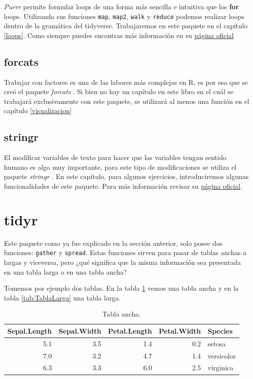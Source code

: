 \documentclass[]{book}
\begin{document}
\emph{Purrr} \citep{HenryPurrr} permite formular loops de una forma más
sencilla e intuitiva que los \textbf{for} loops. Utilizando sus
funciones \texttt{map}, \texttt{map2}, \texttt{walk} y \texttt{reduce}
podemos realizar loops dentro de la gramática del tidyverse.
Trabajaremos en este paquete en el capítulo \ref{loops}. Como siempre
puedes encontras más información en su
\href{https://purrr.tidyverse.org/}{página oficial}

\hypertarget{forcats}{%
\subsection{forcats}\label{forcats}}

Trabajar con factores es una de las labores más complejas en R, es por
eso que se creó el paquete \emph{forcats} \citep{Wickhamforcats}. Si
bien no hay un capítulo en este libro en el cuál se trabajará
exclusivamente con este paquete, se utilizará al menos una función en el
capítulo \ref{visualizacion}

\hypertarget{stringr}{%
\subsection{stringr}\label{stringr}}

El modíficar variables de texto para hacer que las variables tengan
sentido humano es algo muy importante, para este tipo de modificaciones
se utiliza el paquete \emph{stringr} \citep{Wickhamstringr}. En este
capítulo, para algunos ejercicios, introduciremos algunas
funcionalidades de este paquete. Para más información revisar su
\href{https://stringr.tidyverse.org/}{página oficial}.

\hypertarget{tidyr-1}{%
\section{tidyr}\label{tidyr-1}}

Este paquete como ya fue explicado en la sección anterior, solo posee
dos funciones: \texttt{gather} y \texttt{spread}. Estas funciones sirven
para pasar de tablas anchas a largas y viceversa, pero ¿qué significa
que la misma información sea presentada en una tabla larga o en una
tabla ancha?

Tomemos por ejemplo dos tablas. En la tabla \ref{tab:TablaAncha} vemos
una tabla ancha y en la tabla \ref{tab:TablaLarga} una tabla larga.

\begin{table}

\caption{\label{tab:TablaAncha}Tabla ancha.}
\centering
\begin{tabular}[t]{rrrrl}
\toprule
Sepal.Length & Sepal.Width & Petal.Length & Petal.Width & Species\\
\midrule
5.1 & 3.5 & 1.4 & 0.2 & setosa\\
7.0 & 3.2 & 4.7 & 1.4 & versicolor\\
6.3 & 3.3 & 6.0 & 2.5 & virginica\\
\bottomrule
\end{tabular}
\end{table}
\end{document}
